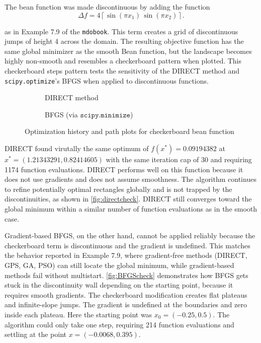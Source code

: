 \documentclass{article}
\begin{document}
The bean function was made discontinuous by adding the function 
\[
\Delta f = 4 \left\lceil \sin(\pi x_1)\,\sin(\pi x_2) \right\rceil .
\]

as in Example 7.9 of the \texttt{mdobook}. This term creates a grid of discontinuous jumps of height 4 across the domain. The resulting objective function has the same global minimizer as the smooth Bean function, but the landscape becomes highly non-smooth and resembles a checkerboard pattern when plotted. This checkerboard steps pattern tests the sensitivity of the DIRECT method and \texttt{scipy.optimize}'s BFGS when applied to discontinuous functions. 

\begin{figure}[H]
\centering
    \begin{subfigure}{0.49\textwidth}
        \centering
        
        \caption{DIRECT method}
        \label{fig:directcheck}
    \end{subfigure}
    \hfill
    \begin{subfigure}{0.49\textwidth}
        \centering
        
        \caption{BFGS (via $\texttt{scipy.minimize}$)}
        \label{fig:BFGScheck}
    \end{subfigure}
\caption{Optimization history and path plots for checkerboard bean function}
\label{fig:checkcomp}
\end{figure}

DIRECT found virutally the same optimum of $f(x^*) = 0.09194382$ at $x^* = (1.21343291, 0.82414605)$ with the same iteration cap of 30 and requiring 1174 function evaluations. DIRECT performs well on this function because it does not use gradients and does not assume smoothness. The algorithm continues to refine potentially optimal rectangles globally and is not trapped by the discontinuities, as shown in \autoref{fig:directcheck}. DIRECT still converges toward the global minimum within a similar number of function evaluations as in the smooth case.

Gradient-based BFGS, on the other hand, cannot be applied reliably because the checkerboard term is discontinuous and the gradient is undefined. This matches the behavior reported in Example 7.9, where gradient-free methods (DIRECT, GPS, GA, PSO) can still locate the global minimum, while gradient-based methods fail without multistart. \autoref{fig:BFGScheck} demonstrates how BFGS gets stuck in the discontinuity wall depending on the starting point, because it requires smooth gradients. The checkerboard modification creates flat plateaus and infinite-slope jumps. The gradient is undefined at the boundaries and zero inside each plateau. Here the starting point was $x_0 = (-0.25, 0.5)$. The algorithm could only take one step, requiring 214 function evaluations and settling at the point $x = (-0.0068, 0.395)$.
\end{document}
